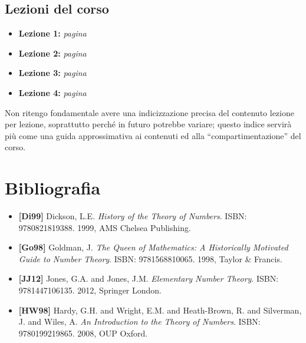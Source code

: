 \documentclass[a4paper,twoside]{book}
\begin{document}
	
	
	\newpage
	\section*{Lezioni del corso}
	\renewcommand{\labelitemi}{$\blacksquare$}
	\begin{itemize}
		\item {\large \textbf{Lezione 1:} \textit{pagina \pageref{lezione1}}}
		\item {\large \textbf{Lezione 2:} \textit{pagina \pageref{lezione2}}}
		\item {\large \textbf{Lezione 3:} \textit{pagina \pageref{lezione3}}}
		\item {\large \textbf{Lezione 4:} \textit{pagina \pageref{lezione4}}}
	\end{itemize}
	\renewcommand{\labelitemi}{$\bullet$}
	Non ritengo fondamentale avere una indicizzazione precisa del contenuto lezione per lezione, soprattutto perché in futuro potrebbe variare; questo indice servirà più come una guida approssimativa ai contenuti ed alla \enquote{compartimentazione} del corso.
	
	
	\mainmatter
	
	
	
	\appendix
	
	
	\chapter{Bibliografia}
	\begin{itemize}
		\item\textbf{[Di99]} Dickson, L.E. \textit{History of the Theory of Numbers}. ISBN: 9780821819388. 1999, AMS Chelsea Publishing.
		\item\textbf{[Go98]} Goldman, J. \textit{The Queen of Mathematics: A Historically Motivated Guide to Number Theory}. ISBN: 9781568810065. 1998, Taylor \& Francis.
		\item\textbf{[JJ12]} Jones, G.A. and Jones, J.M. \textit{Elementary Number Theory}. ISBN: 9781447106135. 2012, Springer London.
		\item\textbf{[HW98]} Hardy, G.H. and Wright, E.M. and Heath-Brown, R. and Silverman, J. and Wiles, A. \textit{An Introduction to the Theory of Numbers}. ISBN: 9780199219865. 2008, OUP Oxford.
	\end{itemize}
	
	
	
	
\end{document}
